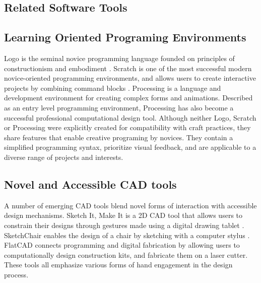 \documentclass{sigchi}
\begin{document}
\subsection{Related Software Tools} %
\subsection{Learning Oriented Programing Environments}
Logo is the seminal novice programming language founded on principles of constructionism and embodiment \cite{papert}. Scratch is one of the most successful modern novice-oriented programming environments, and allows users to create interactive projects by combining command blocks \cite{resnick2}. Processing is a language and development environment for creating complex forms and animations. Described as an entry level programming environment, Processing has also become a successful professional computational design tool\cite{processing}. Although neither Logo, Scratch or Processing were explicitly created for compatibility with craft practices, they share features that enable creative programing by novices. They contain a simplified programming syntax, prioritize visual feedback, and are applicable to a diverse range of projects and interests.
\subsection{Novel and Accessible CAD tools}
A number of emerging CAD tools blend novel forms of interaction with accessible design mechanisms. Sketch It, Make It is a 2D CAD tool that allows users to constrain their designs through gestures made using a digital drawing tablet \cite{sketchit}. SketchChair enables the design of a chair by sketching with a computer stylus \cite{sketchchair}. FlatCAD connects programming and digital fabrication by allowing users to computationally design construction kits, and fabricate them on a laser cutter\cite{flatcad}. These tools all emphasize various forms of hand engagement in the design process.
\end{document}
